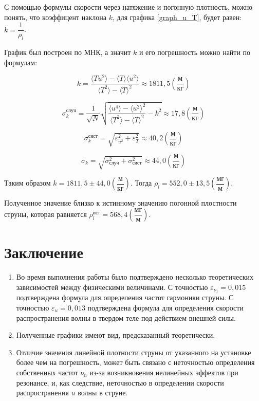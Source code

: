 \documentclass[
a4paper, %
12pt, %
]{article}
\begin{document}
	С помощью формулы скорости через натяжение и погонную плотность, можно понять, что коэффицент наклона $k$, для графика \ref{graph_u_T}, будет равен: $k = \dfrac{1}{\rho_l}$.
	
	График был построен по МНК, а значит $k$ и его погрешность можно найти по формулам:
	
	\begin{equation}
		k=\frac{\langle Tu^2\rangle-\langle T\rangle \langle u^2\rangle}{\langle T^2\rangle - \langle T\rangle^2} \approx 1811,5 \left(\dfrac{\text{м}}{\text{кг}}\right)
	\end{equation}
	
	\begin{equation}
		\sigma_k^\text{случ}=\frac{1}{\sqrt{N}}\sqrt{\frac{\langle u^4 \rangle - \langle u^2 \rangle^2}{\langle T^2 \rangle - \langle T \rangle^2} - k^2  } \approx 17,8 \left(\dfrac{\text{м}}{\text{кг}}\right)
	\end{equation}
	
	\begin{equation}
		\sigma_k^{\text{сист}} = \sqrt{ \varepsilon_{u^2}^2 + \varepsilon_T^2 } \approx 40,2 \left(\dfrac{\text{м}}{\text{кг}}\right)
	\end{equation}
	
	\begin{equation}
		\sigma_k = \sqrt{\sigma_\text{случ}^2 + \sigma_\text{сист}^2} \approx 44,0 \left(\dfrac{\text{м}}{\text{кг}}\right)
	\end{equation}
	
	Таким образом $k = 1811,5 \pm 44,0 \left({ \dfrac{\text{м}}{\text{кг}}}\right) $.
	Тогда $\rho_l = 552,0 \pm 13,5 \left({ \dfrac{\text{мг}}{\text{м}}}\right)$.
	
	Полученное значение близко к истинному значению погонной плостности струны, которая равняется $\rho^{\text{ист}}_l = 568,4\left({ \dfrac{\text{мг}}{\text{м}}}\right) $. 
	
	\newpage
	
	\section{Заключение}
	\begin{enumerate}
		\item
		Во время выполнения работы было подтверждено несколько теоретических зависимостей между физическими величинами. С точностью $\varepsilon_{\nu_{1}} = 0,015$ подтверждена формула для определения частот гармоники струны. С точностью  $\varepsilon_{u} = 0,013$ подтверждена формула для определения скорости распространения волны в твердом теле под действием внешней силы.
		\item
		Полученные графики имеют вид, предсказанный теоретически.
		\item
		Отличие значения линейной плотности струны от указанного на установке более чем на погрешность, может быть связано с неточностью определения собственных частот $\nu_n$ из-за возникновения нелинейных эффектов при резонансе, и, как следствие, неточностью в определении скорости распространения $u$ волны в струне.
	\end{enumerate}
	
	
\end{document}
